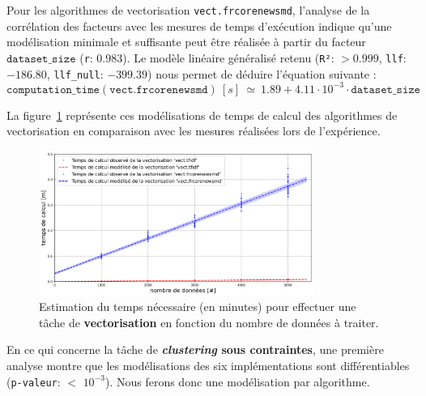 			Pour les algorithmes de vectorisation \texttt{vect.frcorenewsmd}, l'analyse de la corrélation des facteurs avec les mesures de temps d'exécution indique qu'une modélisation minimale et suffisante peut être réalisée à partir du facteur $\texttt{dataset\_size}$ (\texttt{r}: $0.983$).
			Le modèle linéaire généralisé retenu (\texttt{R²}: $> 0.999$, \texttt{llf}: $-186.80$, \texttt{llf\_null}: $-399.39$) nous permet de déduire l'équation suivante :
			\begin{equation}
				\texttt{computation\_time}(\texttt{vect.frcorenewsmd})~[s]~
				\simeq~1.89 + 4.11 \cdot 10^{-3} \cdot \texttt{dataset\_size}
			\end{equation}
			
			La figure~\ref{figure:4.3.2-ETUDE-COUTS-TEMPS-CALCUL-MODELISATION-VECTORIZATION} représente ces modélisations de temps de calcul des algorithmes de vectorisation en comparaison avec les mesures réalisées lors de l'expérience.
			\newline
			\begin{figure}[!htb]
				\centering
				\includegraphics[width=0.8\textwidth]{figures/etude-temps-calcul-modelisation-2vect}
				\caption{Estimation du temps nécessaire (en minutes) pour effectuer une tâche de \textbf{vectorisation} en fonction du nombre de données à traiter.}
				\label{figure:4.3.2-ETUDE-COUTS-TEMPS-CALCUL-MODELISATION-VECTORIZATION}
			\end{figure}
			
			
			En ce qui concerne la tâche de \textbf{\textit{clustering} sous contraintes}, une première analyse montre que les modélisations des six implémentations sont différentiables  (\texttt{p-valeur}: $<$ \texttt{$10^{-3}$}). Nous ferons donc une modélisation par algorithme.
			
